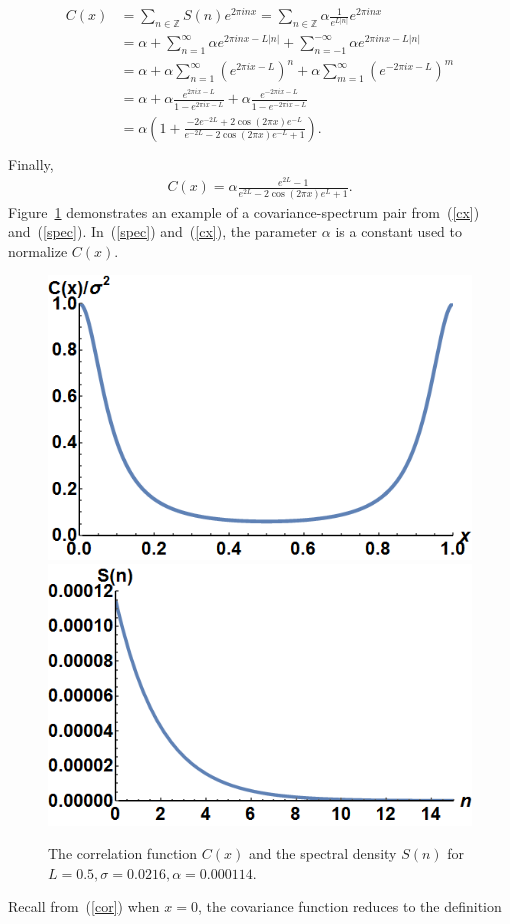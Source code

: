 \begin{align*}
\begin{split}
C(x) &= \sum_{n\in \mathbb{Z}}S(n)e^{2\pi inx}=\sum_{n\in \mathbb{Z}}\alpha \frac{1}{e^{L|n|}}e^{2\pi inx}\\
&= \alpha + \sum_{n=1}^{\infty}\alpha e^{2\pi
  inx-L|n|}+\sum_{n=-1}^{-\infty}\alpha e^{2\pi inx-L|n|}\\
&= \alpha+\alpha \sum_{n=1}^{\infty}(e^{2\pi ix-L})^n+\alpha \sum_{m=1}^{\infty}(e^{-2\pi ix-L})^m\\
&=\alpha + \alpha \frac{e^{2\pi ix-L}}{1-e^{2\pi ix-L}} +\alpha
\frac{e^{-2\pi ix-L}}{1-e^{-2\pi ix-L}}\\
&=\alpha \left(1+ \frac{-2e^{-2L}+2\cos(2\pi x)e^{-L}}{e^{-2L}-2\cos(2\pi x)e^{-L}+1} \right).\\
\end{split}
\end{align*}
Finally,
\begin{align}\label{cx}
C(x)= \alpha \frac{e^{2L}-1}{e^{2L}-2\cos(2\pi x)e^L+1}.
\end{align}
Figure~\ref{fig:covspec} demonstrates an example of a covariance-spectrum
pair from~(\ref{cx}) and~(\ref{spec}). In~(\ref{spec}) and~(\ref{cx}), the parameter $\alpha$ is a constant used to normalize
$C(x)$.
\begin{figure}[htp]
\caption[Schematic example of the covariance-spectrum pair]{The correlation function
  $C(x)$ and the spectral density $S(n)$ for $L=0.5,\sigma=0.0216, \alpha=0.000114$.}\label{fig:covspec}
\centering
\includegraphics[width=.45\textwidth]{figs/cx.png}\hfill
\includegraphics[width=.45\textwidth]{figs/sn.png}
\end{figure}
Recall from~(\ref{cor}) when $x=0$, the covariance function reduces to the definition
